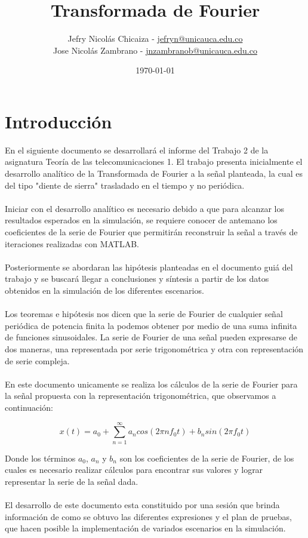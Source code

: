\documentclass[7pt]{article}
\date{\today}.
\title{\textbf{Transformada de Fourier}}
\author{
    Jefry Nicolás Chicaiza - \url{jefryn@unicauca.edu.co}\\
    Jose Nicolás Zambrano - \url{jnzambranob@unicauca.edu.co}
}
\date{}
\begin{document}
\maketitle
\thispagestyle{fancy}
\section*{Introducción}
    En el siguiente documento se desarrollará el informe del Trabajo 2 de la asignatura 
    Teoría de las telecomunicaciones 1. El trabajo presenta inicialmente el desarrollo 
    analítico de la Transformada de Fourier a la señal planteada, la cual es del tipo 
    "diente de sierra"  trasladado en el tiempo y no periódica.\\
    \\
    Iniciar con el desarrollo analítico es necesario debido a que para alcanzar los 
    resultados esperados en la simulación, se requiere conocer de antemano los coeficientes 
    de la serie de Fourier que permitirán reconstruir la señal a través de iteraciones 
    realizadas con MATLAB.\\
    \\
    Posteriormente se abordaran las hipótesis planteadas en el documento guiá del trabajo 
    y se buscará llegar a conclusiones y síntesis a partir de los datos obtenidos en la 
    simulación de los diferentes escenarios.\\
    \\
    Los teoremas e hipótesis nos dicen que la serie de Fourier de cualquier señal periódica de potencia 
    finita la podemos obtener por medio de una suma infinita de funciones sinusoidales. La serie de 
    Fourier de una señal pueden expresarse de dos maneras, una representada por serie trigonométrica y 
    otra con representación de serie compleja.\\ 
    \\
    En este documento unicamente se realiza los cálculos de la serie de Fourier para la señal propuesta 
    con la representación trigonométrica, que observamos a continuación:

    \begin{equation}
        x(t)=a_{0}+\sum_{n=1}^{\infty} a_{n}cos(2\pi nf_{0}t)+b_{n}sin(2\pi f_{0}t)
        \label{equation1}
    \end{equation}
    
    Donde los términos $a_{0}$, $a_{n}$ y $b_{n}$ son los coeficientes de la serie de Fourier, de los cuales
    es necesario realizar cálculos para encontrar sus valores y lograr representar la serie de la señal dada.\\
    \\
    El desarrollo de este documento esta constituido por una sesión que brinda información 
    de como se obtuvo las diferentes expresiones y el plan de pruebas, que hacen posible la 
    implementación de variados escenarios en la simulación.
   
\end{document}
